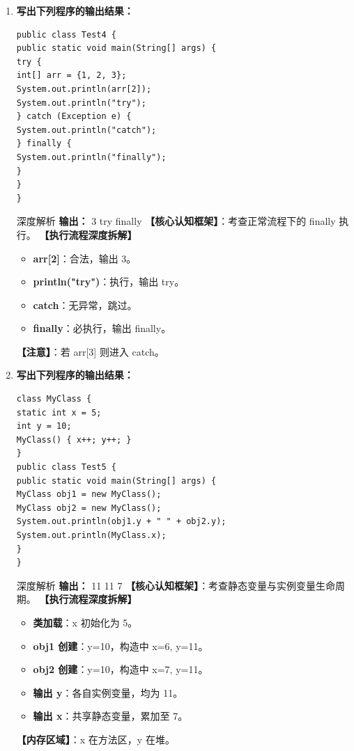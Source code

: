 \documentclass[12pt, a4paper]{ctexart}
\begin{document}
\begin{enumerate}[label=\textbf{\arabic*.}, itemsep=1em]
    \item \textbf{写出下列程序的输出结果：}
    \begin{lstlisting}[style=JavaExam]
public class Test4 {
public static void main(String[] args) {
try {
int[] arr = {1, 2, 3};
System.out.println(arr[2]);
System.out.println("try");
} catch (Exception e) {
System.out.println("catch");
} finally {
System.out.println("finally");
}
}
}
    \end{lstlisting}
    \begin{bluebox}{深度解析}
    \textbf{输出：}
    3
    try
    finally
    \textbf{【核心认知框架】}：考查正常流程下的 finally 执行。
    \textbf{【执行流程深度拆解】}
    \begin{itemize}[leftmargin=*, nosep]
        \item \textbf{arr[2]}：合法，输出 3。
        \item \textbf{println("try")}：执行，输出 try。
        \item \textbf{catch}：无异常，跳过。
        \item \textbf{finally}：必执行，输出 finally。
    \end{itemize}
    \textbf{【注意】}：若 arr[3] 则进入 catch。
    \end{bluebox}

    \item \textbf{写出下列程序的输出结果：}
    \begin{lstlisting}[style=JavaExam]
class MyClass {
static int x = 5;
int y = 10;
MyClass() { x++; y++; }
}
public class Test5 {
public static void main(String[] args) {
MyClass obj1 = new MyClass();
MyClass obj2 = new MyClass();
System.out.println(obj1.y + " " + obj2.y);
System.out.println(MyClass.x);
}
}
    \end{lstlisting}
    \begin{bluebox}{深度解析}
    \textbf{输出：}
    11 11
    7
    \textbf{【核心认知框架】}：考查静态变量与实例变量生命周期。
    \textbf{【执行流程深度拆解】}
    \begin{itemize}[leftmargin=*, nosep]
        \item \textbf{类加载}：x 初始化为 5。
        \item \textbf{obj1 创建}：y=10，构造中 x=6, y=11。
        \item \textbf{obj2 创建}：y=10，构造中 x=7, y=11。
        \item \textbf{输出 y}：各自实例变量，均为 11。
        \item \textbf{输出 x}：共享静态变量，累加至 7。
    \end{itemize}
    \textbf{【内存区域】}：x 在方法区，y 在堆。
    \end{bluebox}
\end{enumerate}
\end{document}
